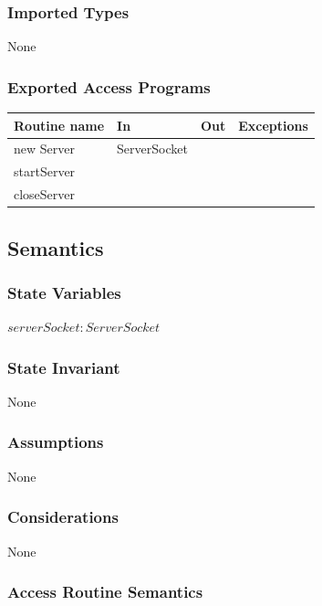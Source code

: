 \documentclass[12pt, titlepage]{article}
\begin{document}
        \subsubsection* {Imported Types}
            None
        \subsubsection* {Exported Access Programs}
        
        \begin{tabular}{| l | l | l | p{6cm} |}
            \hline
            \textbf{Routine name} & \textbf{In} & \textbf{Out} & \textbf{Exceptions}\\
            \hline
            new Server & ServerSocket &  & \\
            \hline
            startServer &  &  & \\
            \hline 
            closeServer &  &  &\\
            \hline 
        \end{tabular}
        
    \subsection* {Semantics}
    
    \subsubsection* {State Variables}
        $\mathit{serverSocket}: ServerSocket$\\

    \subsubsection* {State Invariant}
        None
    
    \subsubsection* {Assumptions}
        None
    
    \subsubsection* {Considerations}
        None
    
    \subsubsection* {Access Routine Semantics}
    
\end{document}
